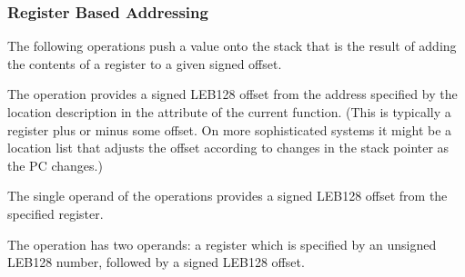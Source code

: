 \subsubsection{Register Based Addressing}
\label{chap:registerbasedaddressing}
The following operations push a value onto the stack that is
the result of adding the contents of a register to a given
signed offset.
\begin{enumerate}[1. ]
\itembfnl{\DWOPfbregTARG}
The \DWOPfbregTARG{} operation provides a 
signed LEB128 offset
from the address specified by the location description in the
\DWATframebase{} attribute of the current function. (This
is typically a  register plus or minus
some offset. On more sophisticated systems it might be a
location list that adjusts the offset according to changes
in the stack pointer as the PC changes.)

\itembfnl{\DWOPbregzeroTARG, \DWOPbregoneTARG, \dots, \DWOPbregthirtyoneTARG}
The single operand of the \DWOPbregnTARG{} 
operations provides
a signed LEB128 offset from
the specified register.

\itembfnl{\DWOPbregxTARG{} }
The \DWOPbregxNAME{} operation has two operands: a register
which is specified by an unsigned LEB128
number, followed by a signed LEB128 offset.

\end{enumerate}


